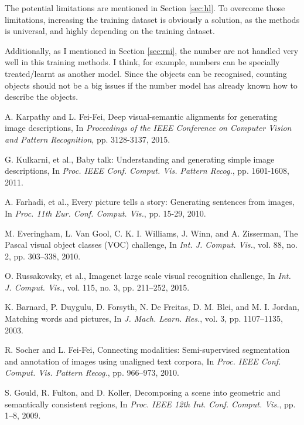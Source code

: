 \documentclass[10pt,twocolumn,letterpaper]{article}
\begin{document}
The potential limitations are mentioned in Section \ref{sec:hl}.
To overcome those limitations, increasing the training dataset is obviously a solution,
as the methods is universal, and highly depending on the training dataset.

Additionally, as I mentioned in Section \ref{sec:rni}, the number are not handled very well in this training methods.
I think, for example, numbers can be specially treated/learnt as another model.
Since the objects can be recognised, counting objects should not be a big issues if
the number model has already known how to describe the objects.


\begin{thebibliography}{99}
A. Karpathy and L. Fei-Fei, Deep visual-semantic alignments for generating image descriptions,
In \textit{Proceedings of the IEEE Conference on Computer Vision and Pattern Recognition}, pp. 3128-3137, 2015.

G. Kulkarni, et al., Baby talk: Understanding and generating simple image descriptions,
In \textit{Proc. IEEE Conf. Comput. Vis. Pattern Recog.}, pp. 1601-1608, 2011.

A. Farhadi, et al., Every picture tells a story: Generating sentences from images,
In \textit{Proc. 11th Eur. Conf. Comput. Vis.}, pp. 15-29, 2010.

M. Everingham, L. Van Gool, C. K. I. Williams, J. Winn, and A. Zisserman, The Pascal visual object classes (VOC) challenge,
In \textit{Int. J. Comput. Vis.}, vol. 88, no. 2, pp. 303–338, 2010.

O. Russakovsky, et al., Imagenet large scale visual recognition challenge,
In \textit{Int. J. Comput. Vis.}, vol. 115, no. 3, pp. 211–252, 2015.

K. Barnard, P. Duygulu, D. Forsyth, N. De Freitas, D. M. Blei, and M. I. Jordan, Matching words and pictures,
In \textit{J. Mach. Learn. Res.}, vol. 3, pp. 1107–1135, 2003.

R. Socher and L. Fei-Fei, Connecting modalities: Semi-supervised segmentation and annotation of images using unaligned text corpora,
In \textit{Proc. IEEE Conf. Comput. Vis. Pattern Recog.}, pp. 966–973, 2010.

S. Gould, R. Fulton, and D. Koller, Decomposing a scene into geometric and semantically consistent regions,
In \textit{Proc. IEEE 12th Int. Conf. Comput. Vis.}, pp. 1–8, 2009.


\end{thebibliography}
\end{document}
